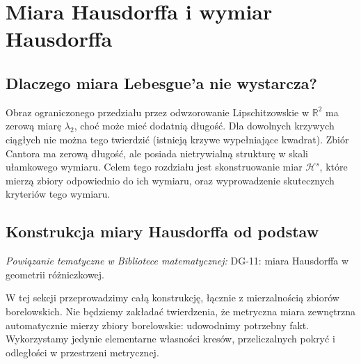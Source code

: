 \chapter{Miara Hausdorffa i wymiar Hausdorffa}
\label{ch:hausdorff-26}

\providecommand{\atlasref}[2]{#2}


\section{Dlaczego miara Lebesgue'a nie wystarcza?}
Obraz ograniczonego przedziału przez odwzorowanie
Lipschitzowskie w $\mathbb R^2$ ma zerową miarę
$\lambda_2$, choć może mieć dodatnią długość.
Dla dowolnych krzywych ciągłych nie można tego
twierdzić (istnieją krzywe wypełniające kwadrat).
Zbiór Cantora ma zerową długość, ale posiada nietrywialną
strukturę w skali ułamkowego wymiaru. Celem tego
rozdziału jest skonstruowanie miar $\mathcal H^s$,
które mierzą zbiory odpowiednio do ich wymiaru, oraz
wyprowadzenie skutecznych kryteriów tego wymiaru.

\section{Konstrukcja miary Hausdorffa od podstaw}
\label{sec:hausdorff-konstrukcja-26}

\noindent\emph{Powiązanie tematyczne w Bibliotece matematycznej:} \atlasref{DG-11::def:miara-hausdorffa}{DG-11: miara Hausdorffa w geometrii różniczkowej}.


W tej sekcji przeprowadzimy całą konstrukcję, łącznie z
mierzalnością zbiorów borelowskich. Nie będziemy zakładać
twierdzenia, że metryczna miara zewnętrzna automatycznie
mierzy zbiory borelowskie: udowodnimy potrzebny fakt.
Wykorzystamy jedynie elementarne własności kresów,
przeliczalnych pokryć i odległości w przestrzeni metrycznej.

